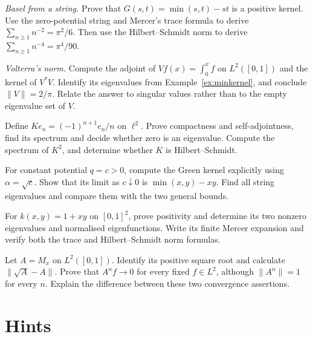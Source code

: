 \begin{exercise}[$\star$]\label{ex:basel}
\emph{Basel from a string.} Prove that $G(s,t)=\min(s,t)-st$ is a positive kernel. Use the zero-potential string and Mercer's trace formula to derive $\sum_{n\ge1}n^{-2}=\pi^2/6$. Then use the Hilbert--Schmidt norm to derive $\sum_{n\ge1}n^{-4}=\pi^4/90$.
\end{exercise}
\begin{exercise}[$\star\star$]\label{ex:volterranorm}
\emph{Volterra's norm.} Compute the adjoint of $Vf(x)=\int_0^xf$ on $L^2([0,1])$ and the kernel of $V^*V$. Identify its eigenvalues from Example~\ref{ex:minkernel}, and conclude $\|V\|=2/\pi$. Relate the answer to singular values rather than to the empty eigenvalue set of $V$.
\end{exercise}

\begin{exercise}[$\star\star$]\label{ex:v8c09a}
Define $Ke_n=(-1)^{n+1}e_n/n$ on $\ell^2$. Prove compactness and self-adjointness, find its spectrum and decide whether zero is an eigenvalue. Compute the spectrum of $K^2$, and determine whether $K$ is Hilbert--Schmidt.
\end{exercise}
\begin{exercise}[$\star\star$]\label{ex:v8c09b}
For constant potential $q=c>0$, compute the Green kernel explicitly using $\alpha=\sqrt c$. Show that its limit as $c\downarrow0$ is $\min(x,y)-xy$. Find all string eigenvalues and compare them with the two general bounds.
\end{exercise}
\begin{exercise}[$\star\star$]\label{ex:v8c09c}
For $k(x,y)=1+xy$ on $[0,1]^2$, prove positivity and determine its two nonzero eigenvalues and normalised eigenfunctions. Write its finite Mercer expansion and verify both the trace and Hilbert--Schmidt norm formulas.
\end{exercise}
\begin{exercise}[$\star\star$]\label{ex:v8c09d}
Let $A=M_x$ on $L^2([0,1])$. Identify its positive square root and calculate $\|\sqrt A-A\|$. Prove that $A^nf\to0$ for every fixed $f\in L^2$, although $\|A^n\|=1$ for every $n$. Explain the difference between these two convergence assertions.
\end{exercise}

\section{Hints}

